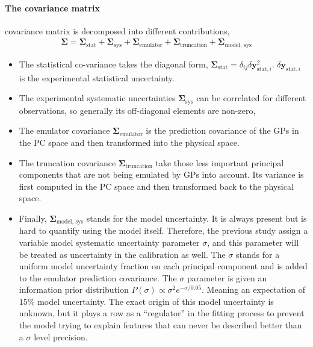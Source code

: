 \paragraph{The covariance matrix} covariance matrix is decomposed into different contributions,
\begin{eqnarray}
\mathbf{\Sigma} = \mathbf{\Sigma}_{\textrm{stat}} + \mathbf{\Sigma}_{\textrm{sys}} + \mathbf{\Sigma}_{\textrm{emulator}} + \mathbf{\Sigma}_{\textrm{truncation}} + \mathbf{\Sigma}_{\textrm{model, sys}}
\end{eqnarray}
\begin{itemize}
\item The statistical co-variance takes the diagonal form, $\mathbf{\Sigma}_{\textrm{stat}} = \delta_{ij}\delta\mathbf{y}_{\textrm{stat}, i}^2$. 
$\delta\mathbf{y}_{\textrm{stat}, i}$ is the experimental statistical uncertainty.
\item The experimental systematic uncertainties $\mathbf{\Sigma}_{\textrm{sys}}$ can be correlated for different observations, so generally its off-diagonal elements are non-zero,
\item The emulator covariance $\mathbf{\Sigma}_{\textrm{emulator}}$ is the prediction covariance of the GPs in the PC space and then transformed into the physical space.
\item The truncation covariance $\mathbf{\Sigma}_{\textrm{truncation}}$ take those less important principal components that are not being emulated by GPs into account. 
Its variance is first computed in the PC space and then transformed back to the physical space.
\item Finally, $\mathbf{\Sigma}_{\textrm{model, sys}}$ stands for the model uncertainty. 
It is always present but is hard to quantify using the model itself.
Therefore, the previous study \cite{Bernhard:2018hnz} assign a variable model systematic uncertainty parameter $\sigma$, and this parameter will be treated as uncertainty in the calibration as well.
The $\sigma$ stands for a uniform model uncertainty fraction on each principal component and is added to the emulator prediction covariance.
The $\sigma$ parameter is given an information prior distribution $P(\sigma) \propto \sigma^2 e^{-\sigma/0.05}$. Meaning an expectation of $15\%$ model uncertainty.
The exact origin of this model uncertainty is unknown, but it plays a row as a ``regulator'' in the fitting process to prevent the model trying to explain features that can never be described better than a $\sigma$ level precision.
\end{itemize}

